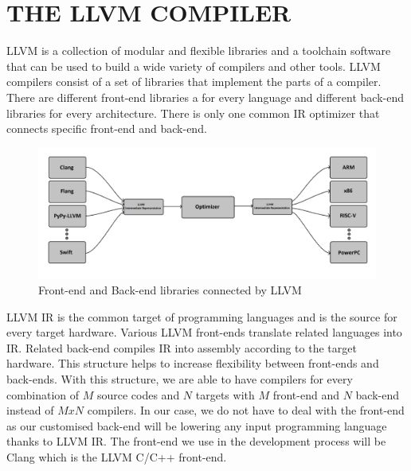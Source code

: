 \clearpage
\chapter{THE LLVM COMPILER}\label{ch:Ch3}

LLVM is a collection of modular and flexible libraries and a toolchain software that can be used to build a wide variety of compilers and other tools. LLVM compilers consist of a set of libraries that implement the parts of a compiler. There are different front-end libraries a for every language and different back-end libraries for every architecture. There is only one common IR optimizer that connects specific front-end and back-end.

\begin{figure}
    \centering
    \includegraphics[scale = 0.8]{the_llvm_compiler/llvm_diagram.png}
    \caption{Front-end and Back-end libraries connected by LLVM}
    \label{fig:llvm_diagram}
\end{figure}

LLVM IR is the common target of programming languages and is the source for every target hardware. Various LLVM front-ends translate related languages into IR. Related back-end compiles IR into assembly according to the target hardware. This structure helps to increase flexibility between front-ends and back-ends. With this structure, we are able to have compilers for every combination of $M$ source codes and $N$ targets with $M$ front-end and $N$ back-end instead of $MxN$ compilers. In our case, we do not have to deal with the front-end as our customised back-end will be lowering any input programming language thanks to LLVM IR. The front-end we use in the development process will be Clang which is the LLVM C/C++ front-end\cite{clang}.

